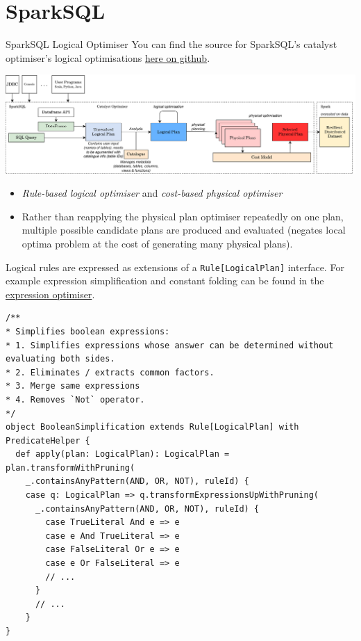 \section{SparkSQL}
\begin{sidenotebox}{SparkSQL Logical Optimiser}
    You can find the source for SparkSQL's catalyst optimiser's logical optimisations \href{https://github.com/apache/spark/blob/master/sql/catalyst/src/main/scala/org/apache/spark/sql/catalyst/optimizer/Optimizer.scala}{here on github}.
\end{sidenotebox}
\begin{center}
    \includegraphics[width=\textwidth]{optimisation/images/catalyst.drawio.png}
\end{center}
\begin{itemize}
    \item \textit{Rule-based logical optimiser} and \textit{cost-based physical optimiser}
    \item Rather than reapplying the physical plan optimiser repeatedly on one plan, multiple possible candidate plans are produced and evaluated (negates local optima problem at the cost of generating many physical plans).
\end{itemize}
\noindent
Logical rules are expressed as extensions of a \texttt{Rule[LogicalPlan]} interface. For example expression simplification and constant folding can be found in the \href{https://github.com/apache/spark/blob/master/sql/catalyst/src/main/scala/org/apache/spark/sql/catalyst/optimizer/expressions.scala}{expression optimiser}.
\begin{verbatim}
/**
* Simplifies boolean expressions:
* 1. Simplifies expressions whose answer can be determined without evaluating both sides.
* 2. Eliminates / extracts common factors.
* 3. Merge same expressions
* 4. Removes `Not` operator.
*/
object BooleanSimplification extends Rule[LogicalPlan] with PredicateHelper {
  def apply(plan: LogicalPlan): LogicalPlan = plan.transformWithPruning(
    _.containsAnyPattern(AND, OR, NOT), ruleId) {
    case q: LogicalPlan => q.transformExpressionsUpWithPruning(
      _.containsAnyPattern(AND, OR, NOT), ruleId) {
        case TrueLiteral And e => e
        case e And TrueLiteral => e
        case FalseLiteral Or e => e
        case e Or FalseLiteral => e
        // ...
      }
      // ...
    }
}
\end{verbatim}
